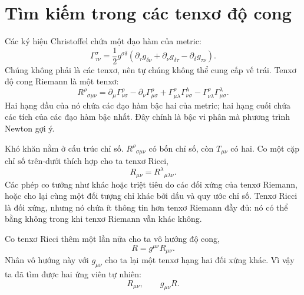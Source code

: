 \section{Tìm kiếm trong các tenxơ độ cong}

Các ký hiệu Christoffel chứa một đạo hàm của metric:
\begin{equation}
 \Gamma^\sigma_{\tau\nu}
 =
 \frac12 g^{\sigma\delta}
 \left(
 \partial_\tau g_{\delta\nu}
 +\partial_\nu g_{\delta\tau}
 -\partial_\delta g_{\tau\nu}
 \right).
 \label{eq:christoffel}
\end{equation}
Chúng không phải là các tenxơ, nên tự chúng không thể cung cấp vế trái. Tenxơ độ cong Riemann là một tenxơ:
\begin{equation}
 R^\rho{}_{\sigma\mu\nu}
 =
 \partial_\mu\Gamma^\rho_{\nu\sigma}
 -\partial_\nu\Gamma^\rho_{\mu\sigma}
 +\Gamma^\rho_{\mu\lambda}\Gamma^\lambda_{\nu\sigma}
 -\Gamma^\rho_{\nu\lambda}\Gamma^\lambda_{\mu\sigma}.
 \label{eq:riemann}
\end{equation}
Hai hạng đầu của nó chứa các đạo hàm bậc hai của metric; hai hạng cuối chứa các tích của các đạo hàm bậc nhất. Đây chính là bậc vi phân mà phương trình Newton gợi ý.

Khó khăn nằm ở cấu trúc chỉ số. \(R^\rho{}_{\sigma\mu\nu}\) có bốn chỉ số, còn \(T_{\mu\nu}\) có hai. Co một cặp chỉ số trên-dưới thích hợp cho ta tenxơ Ricci,
\begin{equation}
 R_{\mu\nu}=R^\lambda{}_{\mu\lambda\nu}.
 \label{eq:ricci}
\end{equation}
Các phép co tưởng như khác hoặc triệt tiêu do các đối xứng của tenxơ Riemann, hoặc cho lại cùng một đối tượng chỉ khác bởi dấu và quy ước chỉ số. Tenxơ Ricci là đối xứng, nhưng nó chứa ít thông tin hơn tenxơ Riemann đầy đủ: nó có thể bằng không trong khi tenxơ Riemann vẫn khác không.

\begin{classroomqa}
\end{classroomqa}

Co tenxơ Ricci thêm một lần nữa cho ta vô hướng độ cong,
\begin{equation}
 R=g^{\mu\nu}R_{\mu\nu}.
 \label{eq:ricci-scalar}
\end{equation}
Nhân vô hướng này với \(g_{\mu\nu}\) cho ta lại một tenxơ hạng hai đối xứng khác. Vì vậy ta đã tìm được hai ứng viên tự nhiên:
\begin{equation}
 R_{\mu\nu},
 \qquad
 g_{\mu\nu}R.
\end{equation}

